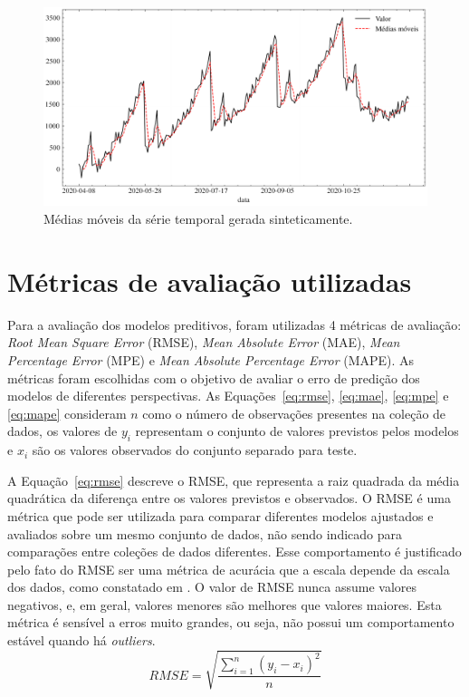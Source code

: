 \begin{figure}[!htp]
    \centering
    \includegraphics[width=5.0in]{img/dados_sinteticos_ma.pdf}
    \caption{Médias móveis da série temporal gerada sinteticamente.}
    \label{fig:dados_sinteticos_ma}
\end{figure}

\FloatBarrier

\section{Métricas de avaliação utilizadas} \label{sec:metrics}

Para a avaliação dos modelos preditivos, foram utilizadas 4 métricas de avaliação: \textit{Root Mean Square Error} (RMSE), \textit{Mean Absolute Error} (MAE), \textit{Mean Percentage Error} (MPE) e \textit{Mean Absolute Percentage Error} (MAPE). As métricas foram escolhidas com o objetivo de avaliar o erro de predição dos modelos de diferentes perspectivas. As Equações~\ref{eq:rmse}, \ref{eq:mae}, \ref{eq:mpe} e \ref{eq:mape} consideram $n$ como o número de observações presentes na coleção de dados, os valores de $y_{i}$ representam o conjunto de valores previstos pelos modelos e $x_{i}$ são os valores observados do conjunto separado para teste.

A Equação~\ref{eq:rmse} descreve o RMSE, que representa a raiz quadrada da média quadrática da diferença entre os valores previstos e observados. O RMSE é uma métrica que pode ser utilizada para comparar diferentes modelos ajustados e avaliados sobre um mesmo conjunto de dados, não sendo indicado para comparações entre coleções de dados diferentes. Esse comportamento é justificado pelo fato do RMSE ser uma métrica de acurácia que a escala depende da escala dos dados, como constatado em \cite{HYNDMAN2006679}. O valor de RMSE nunca assume valores negativos, e, em geral, valores menores são melhores que valores maiores. Esta métrica é sensível a erros muito grandes, ou seja, não possui um comportamento estável quando há \textit{outliers}.
\begin{equation} \label{eq:rmse}
    RMSE=\sqrt{\dfrac{\sum ^{n}_{i=1}\left( y_{i}-x_{i}\right) ^{2}}{n}}
\end{equation}

